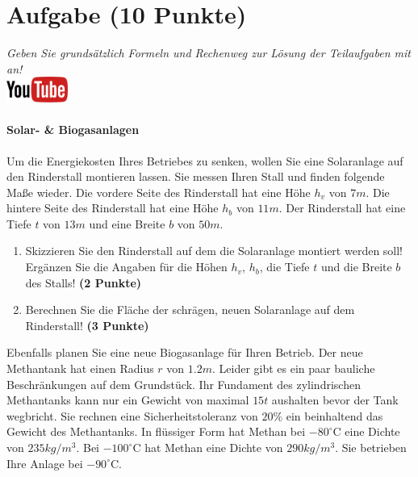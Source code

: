 \documentclass[a4paper, 10pt]{scrartcl}\usepackage[]{graphicx}\usepackage[]{xcolor}
\begin{document}
 
\clearpage

\section{Aufgabe \hfill (10 Punkte)}

\textit{Geben Sie grunds{\"a}tzlich Formeln und Rechenweg zur L{\"o}sung der
  Teilaufgaben mit an!} \\[1Ex]

\hfill\href{https://youtu.be/aBxLkdF-c4M}{\includegraphics[width =
  2cm]{img/youtube}} %
\hspace{2Ex}

\paragraph{Solar- \& Biogasanlagen}



Um die Energiekosten Ihres Betriebes zu senken, wollen Sie eine Solaranlage
auf den Rinderstall montieren lassen. Sie messen Ihren Stall und finden
folgende Ma{\ss}e wieder. Die vordere Seite des Rinderstall hat eine H{\"o}he
$h_v$ von $7m$. Die hintere Seite des Rinderstall hat eine
H{\"o}he $h_b$ von $11m$. Der Rinderstall hat eine Tiefe $t$ von
$13m$ und eine Breite $b$ von $50m$.

\begin{enumerate}
\item Skizzieren Sie den Rinderstall auf dem die Solaranlage montiert
  werden soll! Erg{\"a}nzen Sie die Angaben f{\"u}r die H{\"o}hen $h_v$, $h_b$, die
  Tiefe $t$ und die Breite $b$ des Stalls!  \textbf{(2 Punkte)}
\item Berechnen Sie die Fl{\"a}che der schr{\"a}gen, neuen Solaranlage auf dem
  Rinderstall! \textbf{(3 Punkte)}
\end{enumerate}

Ebenfalls planen Sie eine neue Biogasanlage f{\"u}r Ihren Betrieb. Der neue
Methantank hat einen Radius $r$ von $1.2m$. Leider gibt es ein
paar bauliche Beschr{\"a}nkungen auf dem Grundst{\"u}ck. Ihr Fundament des
zylindrischen Methantanks kann nur ein Gewicht von maximal
$15t$ aushalten bevor der Tank wegbricht. Sie rechnen eine
Sicherheitstoleranz von $20\%$ ein beinhaltend das Gewicht des
Methantanks. In fl{\"u}ssiger Form hat
Methan bei $-80^\circ\text{C}$ eine Dichte von
$235kg/m^3$. Bei $-100^\circ\text{C}$ hat Methan eine Dichte
von $290kg/m^3$. Sie betrieben Ihre Anlage bei
$-90^\circ\text{C}$.
\end{document}
